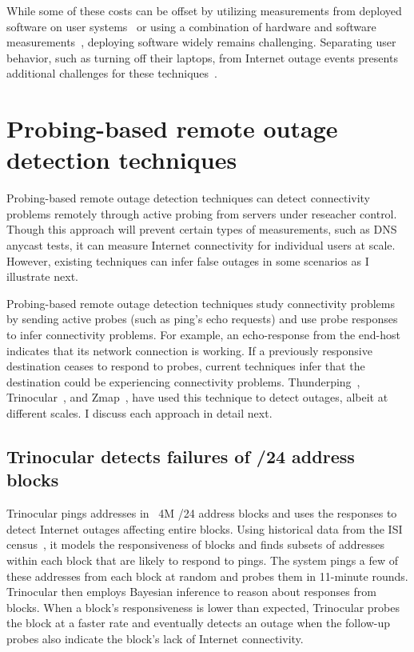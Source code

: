 While some of these costs can be offset by utilizing measurements from
deployed software on user systems~\cite{netdimes, dhcp-dimes, Dasu:NSDI2013} or using a combination of hardware
and software measurements~\cite{IMC2014-Broadband-bischof}, deploying software widely remains
challenging. Separating user behavior, such as turning off their laptops, from
Internet outage events presents additional challenges for these techniques~\cite{dhcp-dimes}.
 
\section{Probing-based remote outage detection techniques}


Probing-based remote outage detection techniques can detect
connectivity problems remotely through active probing from servers
under reseacher control. Though this approach will prevent 
certain types of measurements, such as DNS anycast tests, it can measure
Internet connectivity for individual users at scale. However,
existing techniques can infer false outages in some scenarios as I
illustrate next.

Probing-based remote outage detection techniques study connectivity problems by
sending active probes (such as ping's echo requests) and use probe
responses to infer connectivity problems. For example, an
echo-response from the end-host indicates that its network connection
is working. If a previously responsive destination ceases to respond
to probes, current techniques infer that the destination could be
experiencing connectivity problems. Thunderping~\cite{pingin},
Trinocular~\cite{trinocular}, and Zmap~\cite{durumeric2013zmap}, have
used this technique to detect outages, albeit at different scales. I
discuss each approach in detail next.

\subsection{Trinocular detects failures of /24 address blocks}

Trinocular pings addresses in ~4M /24 address blocks and
uses the responses to detect Internet outages affecting entire blocks. Using historical
data from the ISI census~\cite{census-survey}, it models the responsiveness of
blocks and finds subsets of addresses within each block that are
likely to respond to pings. The system pings a few of these addresses
from each block at random and probes them in 11-minute
rounds. Trinocular then employs Bayesian inference to reason about
responses from blocks. When a block's responsiveness is lower than
expected, Trinocular probes the block at a faster rate and eventually
detects an outage when the follow-up probes also indicate the block's
lack of Internet connectivity.

